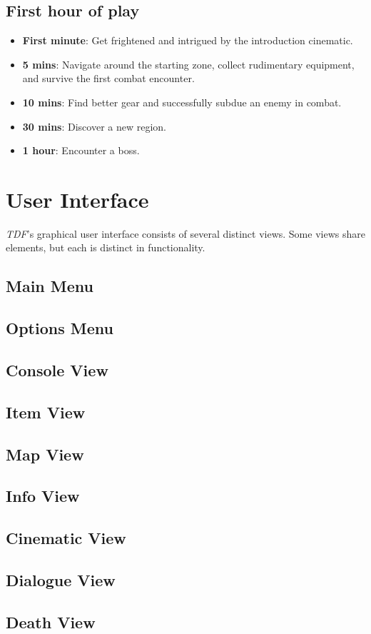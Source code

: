 \documentclass[11pt]{article}
\begin{document}
	\subsection{First hour of play}
	
	\begin{itemize}
		\item\textbf{First minute}: Get frightened and intrigued by the introduction cinematic.
		\item\textbf{5 mins}: Navigate around the starting zone, collect rudimentary equipment, and survive the first combat encounter.
		\item\textbf{10 mins}: Find better gear and successfully subdue an enemy in combat.
		\item\textbf{30 mins}: Discover a new region.
		\item\textbf{1 hour}: Encounter a boss.
	\end{itemize}

	\section{User Interface}
	
	\textit{TDF}'s graphical user interface consists of several distinct views. Some views share elements, but each is distinct in functionality.
	
	\subsection{Main Menu}
	
	\subsection{Options Menu}
	
	\subsection{Console View}
	
	\subsection{Item View}
	
	\subsection{Map View}
	
	\subsection{Info View}
	
	\subsection{Cinematic View}
	
	\subsection{Dialogue View}
	
	\subsection{Death View}
	
\end{document}
